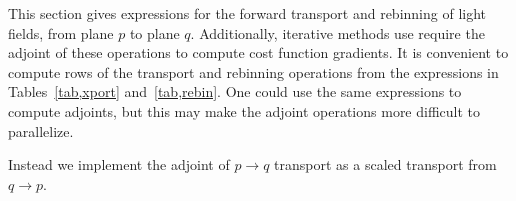 This section gives expressions for the forward transport and rebinning of light
fields, \eg from plane $p$ to plane $q$.  Additionally, iterative methods use
require the adjoint of these operations to compute \eg{} cost function gradients.
It is convenient to compute rows of the transport and rebinning operations 
from the expressions in Tables~\ref{tab,xport} and~\ref{tab,rebin}.  One could
use the same expressions to compute adjoints, but this may make the adjoint
operations more difficult to parallelize.

Instead we implement the adjoint of $p \rightarrow q$ transport as a scaled
transport from $q \rightarrow p$.

